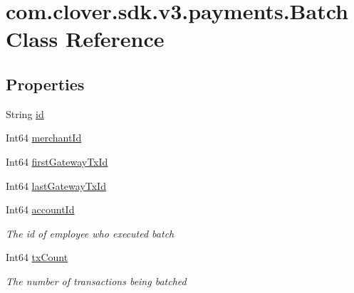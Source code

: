 \hypertarget{classcom_1_1clover_1_1sdk_1_1v3_1_1payments_1_1_batch}{}\section{com.\+clover.\+sdk.\+v3.\+payments.\+Batch Class Reference}
\label{classcom_1_1clover_1_1sdk_1_1v3_1_1payments_1_1_batch}
\subsection*{Properties}
\begin{DoxyCompactItemize}
\item 
String \hyperlink{classcom_1_1clover_1_1sdk_1_1v3_1_1payments_1_1_batch_abeda4625816060f41202fead89654513}{id}
\item 
Int64 \hyperlink{classcom_1_1clover_1_1sdk_1_1v3_1_1payments_1_1_batch_a46a770d203a42ff9283721d8744c6430}{merchant\+Id}
\item 
Int64 \hyperlink{classcom_1_1clover_1_1sdk_1_1v3_1_1payments_1_1_batch_aca9e66b9936d2a0206c0cbf72885ab11}{first\+Gateway\+Tx\+Id}
\item 
Int64 \hyperlink{classcom_1_1clover_1_1sdk_1_1v3_1_1payments_1_1_batch_a85dd236d4354d1fedc74b5af30d6a56f}{last\+Gateway\+Tx\+Id}
\item 
Int64 \hyperlink{classcom_1_1clover_1_1sdk_1_1v3_1_1payments_1_1_batch_a1b04e1c45cbaaf0f0018645c91f1d6db}{account\+Id}
\begin{DoxyCompactList}\small\item\em The id of employee who executed batch \end{DoxyCompactList}\item 
Int64 \hyperlink{classcom_1_1clover_1_1sdk_1_1v3_1_1payments_1_1_batch_a787364af27ddf1d31e92a4c1b47c9fad}{tx\+Count}
\begin{DoxyCompactList}\small\item\em The number of transactions being batched \end{DoxyCompactList}\item 

\end{DoxyCompactItemize}
